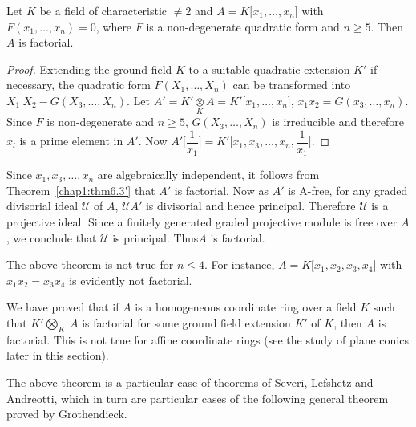 \begin{theorem}%
 Let $K$ be a field of characteristic $\neq 2$ and $A = K \big [x_1, \ldots ,
      x_n \big]$ with $F (x_1, \ldots , x_n) = 0$, where $F$ is a
    non-degenerate quadratic form and $n \ge 5$. Then $A$ is
    factorial. 
\end{theorem}

\begin{proof}
Extending the ground field $K$ to  a suitable quadratic extension $K'$ if
necessary, the quadratic form $F (X_1, \ldots , X_n)$ can be
transformed into $X_1 ~ X_2 - G(X_3, \ldots , X_n)$. Let $A' = K'
\underset{K}{\otimes} A = K' \big [x_1, \ldots , x_n \big]$, $x_1x_2 =
G(x_3, \ldots , x_n)$. Since $F$ is non-degenerate and $n \ge 5$, $G
(X_3, \ldots , X_n)$ is irreducible and therefore $x_l$ is a prime
element in $A'$. Now $A' \big [\dfrac{1}{x_1}\big] = K' \big [ x_1,
  x_3, \ldots , x_n , \dfrac{1}{x_1}\big]$. 
\end{proof}

\noindent
Since $x_1, x_3, \ldots , x_n$ are algebraically independent, it
follows from Theorem~\ref{chap1:thm6.3'} that $A'$ is factorial. Now
as $A'$ is 
A-free, for any graded divisorial ideal $\mathscr{U}$ of $A$,
$\mathscr{U} A'$ is divisorial and hence principal. Therefore
$\mathscr{U}$ is a projective ideal. Since a finitely generated graded
projective module is free over $A$, we conclude that $\mathscr{U}$
is principal. Thus\pageoriginale $A$ is factorial. 

\setcounter{rem}{0}
\begin{rem} %
The above theorem is not true for $n \le 4$. For instance, $A = K \big
[ x_1, x_2, x_3, x_4 \big]$ with $x_1 x_2 = x_3 x_4$ is evidently not
factorial.  
\end{rem}

\begin{rem} %
 We have proved that if $A$ is a homogeneous coordinate ring over a
 field $K$ such that $K' \bigotimes\limits_{K} ~ A$ is factorial for
 some ground field extension $K'$ of $K$, then $A$ is factorial. This
 is not true for affine coordinate rings (see the study of plane
 conics later in this section). 
\end{rem}

\begin{rem} %
The above theorem is a particular case of theorems of Severi, Lefshetz
and Andreotti, which in turn are particular cases of the following
general theorem proved by Grothendieck. 
\end{rem}

